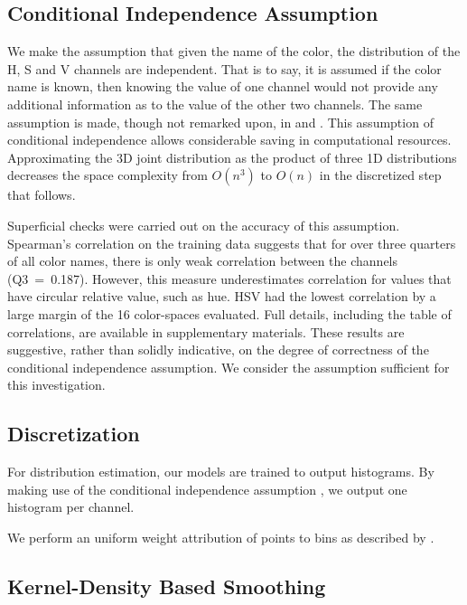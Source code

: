 \documentclass[11pt,a4paper]{article}
\newcommand{\textcite}{\citet}
\begin{document}
\subsection{Conditional Independence Assumption}\label{sec:conditional-independence-assumption}
We make the assumption that given the name of the color, the distribution of the H, S and V channels are independent.
That is to say, it is assumed if the color name is known, then  knowing the value of one channel would not provide any additional information as to the value of the other two channels.
The same assumption is made, though not remarked upon, in \textcite{meomcmahanstone:color} and \textcite{mcmahan2015bayesian}.
This assumption of conditional independence allows considerable saving in computational resources.
Approximating the 3D joint distribution as the product of three 1D distributions decreases the space complexity from $O(n^3)$ to $O(n)$ in the discretized step that follows.

Superficial checks were carried out on the accuracy of this assumption.
Spearman's correlation on the training data suggests that for over three quarters of all color names, there is only weak correlation between the channels (\mbox{Q3 = 0.187}).
However, this measure underestimates correlation for values that have circular relative value, such as hue.
HSV had the lowest correlation by a large margin of the 16 color-spaces evaluated.
Full details, including the table of correlations, are available in supplementary materials.
These results are suggestive, rather than solidly indicative, on the degree of correctness of the conditional independence assumption.
We consider the assumption sufficient for this investigation.

\subsection{Discretization}
For distribution estimation, our models are trained to output histograms.
By making use of the conditional independence assumption , we output one histogram per channel.

We perform an uniform weight attribution of points to bins as described by \textcite{jones1984remark}.


\subsection{Kernel-Density Based Smoothing}\label{sec:kernel-density-based-smoothing}
\end{document}
